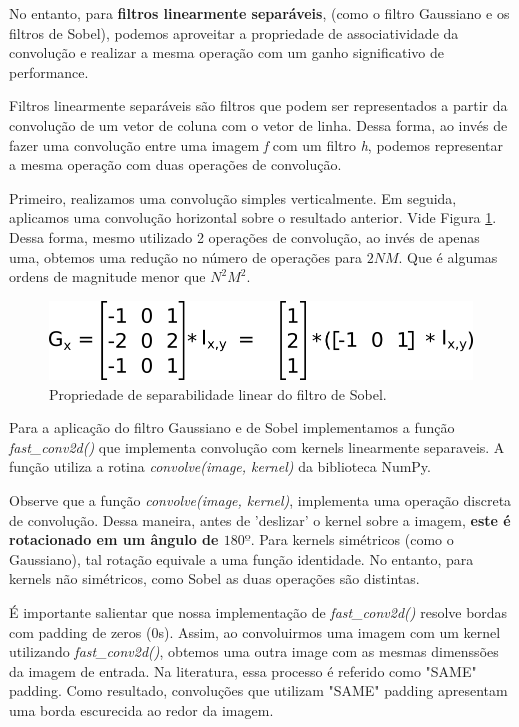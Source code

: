 \documentclass[10pt,twocolumn,letterpaper]{article}
\begin{document}
No entanto, para \textbf{filtros linearmente separáveis}, (como o filtro Gaussiano e os filtros de Sobel), podemos aproveitar a propriedade de associatividade da convolução e realizar a mesma operação com um ganho significativo de performance.

Filtros linearmente separáveis são filtros que podem ser representados a partir da convolução de um vetor de coluna com o vetor de linha. Dessa forma, ao invés de fazer uma convolução entre uma imagem \textit{f} com um filtro \textit{h}, podemos representar a mesma operação com duas operações de convolução. 

Primeiro, realizamos uma convolução simples verticalmente. Em seguida, aplicamos uma convolução horizontal sobre o resultado anterior. Vide Figura \ref{fig:linear_sep_kernel}. Dessa forma, mesmo utilizado 2 operações de convolução, ao invés de apenas uma, obtemos uma redução no número de operações para $2NM$. Que é algumas ordens de magnitude menor que $N^2M^2$. 

\begin{figure}[h!]
\begin{center}
	\includegraphics[width=0.99\columnwidth]{pics/linear_sep_kernel}
	\caption{Propriedade de separabilidade linear do filtro de Sobel.\label{fig:linear_sep_kernel}}   
\end{center} 
\end{figure}  

Para a aplicação do filtro Gaussiano e de Sobel implementamos a função \textit{fast\_conv2d()} que implementa convolução com kernels linearmente separaveis. A função utiliza a rotina \textit{convolve(image, kernel)} da biblioteca NumPy.

Observe que a função \textit{convolve(image, kernel)}, implementa uma operação discreta de convolução. Dessa maneira, antes de 'deslizar' o kernel sobre a imagem, \textbf{este é rotacionado em um ângulo de $180º$}. Para kernels simétricos (como o Gaussiano), tal rotação equivale a uma função identidade. No entanto, para kernels não simétricos, como Sobel as duas operações são distintas.

É importante salientar que nossa implementação de \textit{fast\_conv2d()} resolve bordas com padding de zeros (0s). Assim, ao convoluirmos uma imagem com um kernel utilizando \textit{fast\_conv2d()}, obtemos uma outra image com as mesmas dimenssões da imagem de entrada. Na literatura, essa processo é referido como "SAME" padding. Como resultado, convoluções que utilizam "SAME" padding apresentam uma borda escurecida ao redor da imagem.
\end{document}
